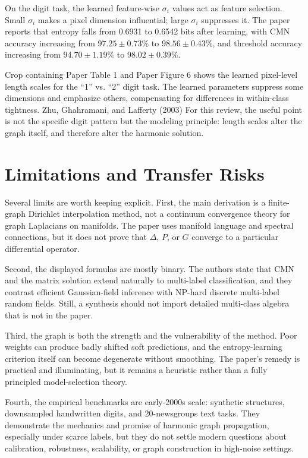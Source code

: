 \documentclass[11pt]{article}
\begin{document}
\FloatBarrier

On the digit task, the learned feature-wise \(\sigma_i\) values act as feature
selection. Small \(\sigma_i\) makes a pixel dimension influential; large
\(\sigma_i\) suppresses it. The paper reports that entropy falls from 0.6931 to
0.6542 bits after learning, with CMN accuracy increasing from
\(97.25\pm0.73\%\) to \(98.56\pm0.43\%\), and threshold accuracy increasing
from \(94.70\pm1.19\%\) to \(98.02\pm0.39\%\).

{Crop containing Paper Table 1 and Paper Figure 6 shows the learned
pixel-level length scales for the ``1'' vs. ``2'' digit task. The learned
parameters suppress some dimensions and emphasize others, compensating for
differences in within-class tightness.}
{Zhu, Ghahramani, and Lafferty (2003)}
{For this review, the useful point is not the specific digit pattern but the
modeling principle: length scales alter the graph itself, and therefore alter
the harmonic solution.}

\FloatBarrier

\section{Limitations and Transfer Risks}

Several limits are worth keeping explicit. First, the main derivation is a
finite-graph Dirichlet interpolation method, not a continuum convergence theory
for graph Laplacians on manifolds. The paper uses manifold language and spectral
connections, but it does not prove that \(\Delta\), \(P\), or \(G\) converge to a
particular differential operator.

Second, the displayed formulas are mostly binary. The authors state that CMN and
the matrix solution extend naturally to multi-label classification, and they
contrast efficient Gaussian-field inference with NP-hard discrete multi-label
random fields. Still, a synthesis should not import detailed multi-class
algebra that is not in the paper.

Third, the graph is both the strength and the vulnerability of the method. Poor
weights can produce badly shifted soft predictions, and the entropy-learning
criterion itself can become degenerate without smoothing. The paper's remedy is
practical and illuminating, but it remains a heuristic rather than a fully
principled model-selection theory.

Fourth, the empirical benchmarks are early-2000s scale: synthetic structures,
downsampled handwritten digits, and 20-newsgroups text tasks. They demonstrate
the mechanics and promise of harmonic graph propagation, especially under scarce
labels, but they do not settle modern questions about calibration, robustness,
scalability, or graph construction in high-noise settings.
\end{document}
